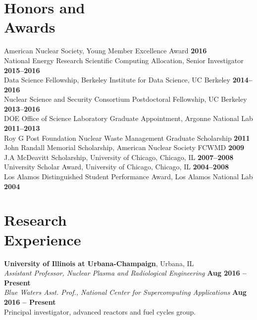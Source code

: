 \documentclass[margin,line]{resume}
\begin{document}
\begin{resume}
    \section{\mysidestyle Honors and\\Awards}
                American Nuclear Society, Young Member Excellence Award                         \hfill \textbf{2016}\vspace{.5mm}\\%
                National Energy Research Scientific Computing Allocation, Senior Investigator     \hfill \textbf{2015--2016}\vspace{.5mm}\\%
                Data Science Fellowship, Berkeley Institute for Data Science, UC Berkeley     \hfill \textbf{2014--2016}\vspace{.5mm}\\%
                Nuclear Science and Security Consortium Postdoctoral Fellowship, UC Berkeley  \hfill \textbf{2013--2016}\vspace{.5mm}\\%
		DOE Office of Science Laboratory Graduate Appointment, Argonne National Lab   \hfill \textbf{2011--2013}\vspace{.5mm}\\%
		Roy G  Post Foundation Nuclear Waste Management Graduate Scholarship                \hfill \textbf{2011}\vspace{.5mm}\\%
		John Randall Memorial Scholarship, American Nuclear Society FCWMD                   \hfill \textbf{2009}\vspace{.5mm}\\%
		J.A  McDeavitt Scholarship, University of Chicago, Chicago, IL                 \hfill\textbf{2007--2008}\vspace{.5mm}\\%
		University Scholar Award, University of Chicago, Chicago, IL                   \hfill\textbf{2004--2008}\vspace{.5mm}\\%
		Los Alamos Distinguished Student Performance Award, Los Alamos National Lab                         \hfill\textbf{2004}%
    \section{\mysidestyle Research\\Experience}
    \textbf{University of Illinois at Urbana-Champaign}, Urbana, IL\\
		\textsl{Assistant Professor, Nuclear Plasma and Radiological Engineering} \hfill \textbf{Aug 2016 -- Present}\\
		\textsl{Blue Waters Asst. Prof., National Center for Supercomputing Applications} \hfill \textbf{Aug 2016 -- Present}\\
                Principal investigator, advanced reactors and fuel cycles group.


\end{resume}
\end{document}

